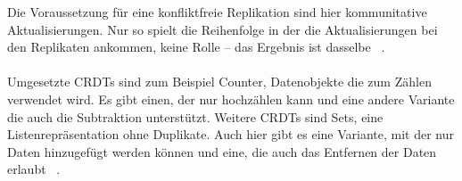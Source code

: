 Die Voraussetzung für eine konfliktfreie Replikation sind hier kommunitative Aktualisierungen.
Nur so spielt die Reihenfolge in der die Aktualisierungen bei den Replikaten ankommen, keine Rolle -- das Ergebnis ist dasselbe ~\cite{crdt_shapiro2}.\\\\
%
%
Umgesetzte \glspl{CRDT} sind zum Beispiel Counter, Datenobjekte die zum Zählen verwendet wird. Es gibt einen, der nur hochzählen kann und eine andere Variante die auch die Subtraktion unterstützt.
Weitere \glspl{CRDT} sind Sets, eine Listenrepräsentation ohne Duplikate. Auch hier gibt es eine Variante, mit der nur Daten hinzugefügt werden können und eine, die auch das Entfernen der Daten erlaubt ~\cite{crdt_shapiro}.
%
%
